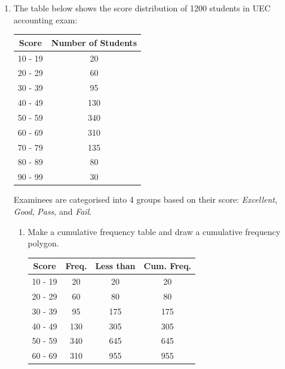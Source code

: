 \documentclass{report}
\begin{document}
\begin{multicols}{2}
\begin{enumerate}
    \item The table below shows the score distribution of 1200 students in UEC accounting
          exam:
          \begin{center}
            \begin{tabular}{|c|c|}
              \hline
              Score   & Number of Students \\
              \hline
              10 - 19 & 20                 \\
              20 - 29 & 60                 \\
              30 - 39 & 95                 \\
              40 - 49 & 130                \\
              50 - 59 & 340                \\
              60 - 69 & 310                \\
              70 - 79 & 135                \\
              80 - 89 & 80                 \\
              90 - 99 & 30                 \\
              \hline
            \end{tabular}
          \end{center}
          Examinees are categorised into 4 groups based on their score: \textit{Excellent}, \textit{Good}, \textit{Pass}, and \textit{Fail}.
          \begin{enumerate}
            \item Make a cumulative frequency table and draw a cumulative frequency polygon.
                  \sol{}
                  \begin{center}
                    \begin{tabular}{|c|c|c|c|}
                      \hline
                      Score   & Freq. & Less than & Cum. Freq. \\
                      \hline
                      10 - 19 & 20    & 20        & 20         \\
                      20 - 29 & 60    & 80        & 80         \\
                      30 - 39 & 95    & 175       & 175        \\
                      40 - 49 & 130   & 305       & 305        \\
                      50 - 59 & 340   & 645       & 645        \\
                      60 - 69 & 310   & 955       & 955        \\

\end{tabular}
\end{center}
\end{enumerate}
\end{enumerate}
\end{multicols}
\end{document}
